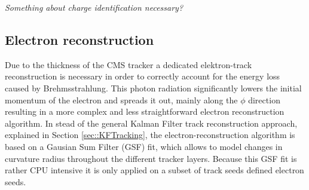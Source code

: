 \textit{Something about charge identification necessary?}
%
 
\subsection{Electron reconstruction} \label{subsec::Electron}

Due to the thickness of the CMS tracker a dedicated elektron-track reconstruction is necessary in order to correctly account for the energy loss caused by Brehmsstrahlung. 
This photon radiation significantly lowers the initial momentum of the electron and spreads it out, mainly along the $\phi$ direction resulting in a more complex and less straightforward electron reconstruction algorithm.
In stead of the general Kalman Filter track reconstruction approach, explained in Section \ref{sec::KFTracking}, the electron-reconstruction algorithm is based on a Gausian Sum Filter (GSF) fit, which allows to model changes in curvature radius throughout the different tracker layers. Because this GSF fit is rather CPU intensive it is only applied on a subset of track seeds defined electron seeds.


